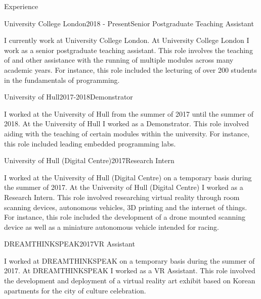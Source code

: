 \documentclass{cv}
\begin{document}
    \begin{rSection}{Experience}
        \begin{rSubsection}{University College London}{2018 - Present}{Senior Postgraduate Teaching Assistant}{}
            \item I currently work at University College London. At University College London I work as a senior postgraduate teaching assistant. This role involves the teaching of and other assistance with the running of multiple modules across many academic years. For instance, this role included the lecturing of over 200 students in the fundamentals of programming.
        \end{rSubsection}
        
        \begin{rSubsection}{University of Hull}{2017-2018}{Demonstrator}{}
            \item I worked at the University of Hull from the summer of 2017 until the summer of 2018. At the University of Hull I worked as a Demonstrator. This role involved aiding with the teaching of certain modules within the university. For instance, this role included leading embedded programming labs.
        \end{rSubsection}
        
        \begin{rSubsection}{University of Hull (Digital Centre)}{2017}{Research Intern}{}
            \item I worked at the University of Hull (Digital Centre) on a temporary basis during the summer of 2017. At the University of Hull (Digital Centre) I worked as a Research Intern. This role involved researching virtual reality through room scanning devices, autonomous vehicles, 3D printing and the internet of things. For instance, this role included the development of a drone mounted scanning device as well as a miniature autonomous vehicle intended for racing.
        \end{rSubsection}
        
        \begin{rSubsection}{DREAMTHINKSPEAK}{2017}{VR Assistant}{}
            \item I worked at DREAMTHINKSPEAK on a temporary basis during the summer of 2017. At DREAMTHINKSPEAK I worked as a VR Assistant. This role involved the development and deployment of a virtual reality art exhibit based on Korean apartments for the city of culture celebration.
        \end{rSubsection}
    \end{rSection}
    
\end{document}

